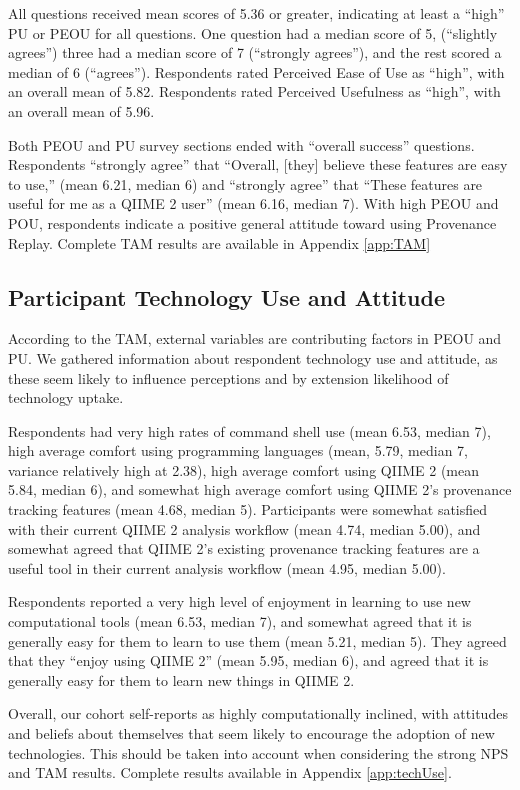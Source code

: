All questions received mean scores of 5.36 or greater, indicating at least a
“high” PU or PEOU for all questions. One question had a median score of 5,
(“slightly agrees”) three had a median score of 7 (“strongly agrees”), and
the rest scored a median of 6 (“agrees”). Respondents rated Perceived Ease of
Use as “high”, with an overall mean of 5.82. Respondents rated Perceived
Usefulness as “high”, with an overall mean of 5.96.

Both PEOU and PU survey sections ended with “overall success” questions.
Respondents “strongly agree” that “Overall, [they] believe these features are
easy to use,” (mean 6.21, median 6) and “strongly agree” that “These features
are useful for me as a QIIME 2 user” (mean 6.16, median 7). With high PEOU and
POU, respondents indicate a positive general attitude toward using Provenance
Replay. Complete TAM results are available in Appendix \ref{app:TAM}

\subsection{Participant Technology Use and Attitude}

According to the TAM, external variables are contributing factors in PEOU and
PU. We gathered information about respondent technology use and attitude, as
these seem likely to influence perceptions and by extension likelihood of
technology uptake.

Respondents had very high rates of command shell use (mean 6.53, median 7), high
average comfort using programming languages (mean, 5.79, median 7, variance
relatively high at 2.38), high average comfort using QIIME 2 (mean 5.84, median
6), and somewhat high average comfort using QIIME 2’s provenance tracking
features (mean 4.68, median 5). Participants were somewhat satisfied with their
current QIIME 2 analysis workflow (mean 4.74, median 5.00), and somewhat agreed
that QIIME 2’s existing provenance tracking features are a useful tool in their
current analysis workflow (mean 4.95, median 5.00).

Respondents reported a very high level of enjoyment in learning to use new
computational tools (mean 6.53, median 7), and somewhat agreed that it is
generally easy for them to learn to use them (mean 5.21, median 5). They agreed
that they “enjoy using QIIME 2” (mean 5.95, median 6), and agreed that it is
generally easy for them to learn new things in QIIME 2. 

Overall, our cohort self-reports as highly computationally inclined, with
attitudes and beliefs about themselves that seem likely to encourage the
adoption of new technologies. This should be taken into account when considering
the strong NPS and TAM results. Complete results available in Appendix \ref{app:techUse}.

